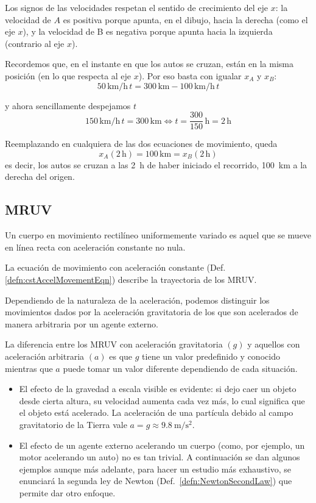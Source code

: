 \documentclass[a5paper,12pt,twoside]{book}
\begin{document}
\begin{mdframed}[style=MyFrame2]
    Los signos de las velocidades respetan el sentido de crecimiento del eje $x$: la velocidad de $A$ es positiva porque apunta, en el dibujo, hacia la derecha (como el eje $x$), y la velocidad de B es negativa porque apunta hacia la izquierda (contrario al eje $x$).
    
    Recordemos que, en el instante en que los autos se cruzan, están en la misma posición (en lo que respecta al eje $x$).
    Por eso basta con igualar $x_A$ y $x_B$:
    \[ 50\,\si{\kilo\metre\per\hour} \, t = 300\,\si{\kilo\metre} - 100\,\si{\kilo\metre\per\hour} \, t \]
    
    y ahora sencillamente despejamos $t$
    \[ 150\,\si{\kilo\metre\per\hour} \, t = 300\,\si{\kilo\metre}
    \iff t = \frac{300}{150}\,\si{\hour} = 2\,\si{\hour} \]
    
    Reemplazando en cualquiera de las dos ecuaciones de movimiento, queda
    \[ x_A(2\,\si{\hour}) = 100\,\si{\kilo\metre} = x_B(2\,\si{\hour}) \]
    es decir, los autos se cruzan a las \SI{2}{\hour} de haber iniciado el recorrido, \SI{100}{\kilo\meter} a la derecha del origen.
\end{mdframed}


\subsection{MRUV}

Un cuerpo en movimiento rectilíneo uniformemente variado es aquel que se mueve en línea recta con aceleración constante no nula.

La ecuación de movimiento con aceleración constante (Def. \ref{defn:cstAccelMovementEqn}) describe la trayectoria de los MRUV.

Dependiendo de la naturaleza de la aceleración, podemos distinguir los movimientos dados por la aceleración gravitatoria de los que son acelerados de manera arbitraria por un agente externo.

La diferencia entre los MRUV con aceleración gravitatoria $(g)$ y aquellos con aceleración arbitraria $(a)$ es que $g$ tiene un valor predefinido y conocido mientras que $a$ puede tomar un valor diferente dependiendo de cada situación.

\begin{itemize}
    \item El efecto de la gravedad a escala visible es evidente: si dejo caer un objeto desde cierta altura, su velocidad aumenta cada vez más, lo cual significa que el objeto está acelerado. La aceleración de una partícula debido al campo gravitatorio de la Tierra vale $a = g \approx \SI{9,8}{\metre/\second\squared}$.

    \item El efecto de un agente externo acelerando un cuerpo (como, por ejemplo, un motor acelerando un auto) no es tan trivial. A continuación se dan algunos ejemplos aunque más adelante, para hacer un estudio más exhaustivo, se enunciará la segunda ley de Newton (Def.\ \ref{defn:NewtonSecondLaw}) que permite dar otro enfoque.
\end{itemize}
\end{document}

